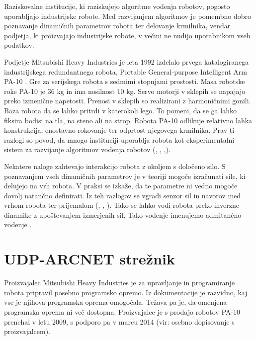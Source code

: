\documentclass[a4paper]{article}
\begin{document}
Raziskovalne institucije, ki raziskujejo algoritme vodenja robotov, pogosto uporabljajo industrijske robote. Med razvijanjem algoritmov je pomembno dobro poznavanje dinamičnih parametrov robota ter delovanje krmilnika, vendar podjetja, ki proizvajajo industrijske robote, v večini ne nudijo uporabnikom vseh podatkov.

Podjetje Mitsubishi Heavy Industries je leta 1992 izdelalo prvega katalogiranega industrijskega redundantnega robota, Portable General-purpose Intelligent Arm PA-10 \cite{mhi_pa10}. Gre za serijskega robota s sedmimi stopnjami prostosti. Masa robotske roke PA-10 je 36 kg in ima nosilnost 10 kg. Servo motorji v sklepih se napajajo preko izmenične napetosti. Prenosi v sklepih so realizirani z harmoničnimi gonili. Baza robota da se lahko pritrdi v katerokoli lego. To pomeni, da se ga lahko fiksira bodisi na tla, na steno ali na strop. Robota PA-10 odlikuje relativno lahka konstrukcija, enostavno rokovanje ter odprtost njegovega krmilnika. Prav ti razlogi so povod, da mnogo instituciji uporablja robota kot eksperimentalni sistem za razvijanje algoritmov vodenja robotov (\cite{voung_pa10}, \cite{aalst_pa10}, \cite{rodrigo_pa10},\cite{petric_nevronska}).

Nekatere naloge zahtevajo interakcijo robota z okoljem s določeno silo. S poznavanjem vseh dinamičnih parametrov je v teoriji mogoče izračunati sile, ki delujejo na vrh robota. V praksi se izkaže, da te parametre ni vedno mogoče dovolj natančno definirati. Iz teh razlogov se vgradi senzor sil in navorov med vrhom robota ter prijemalom (\cite{almassri_pressure_sensor}, \cite{mihelj_vodenje}, \cite{eppinger_force_dynamics}). Tako se lahko vodi robota preko inverzne dinamike z upoštevanjem izmerjenih sil. Tako vodenje imenujemo admitančno vodenje \cite{mihelj_hapt}.

	
\section{UDP-ARCNET strežnik}

Proizvajalec Mitsubishi Heavy Industries je za upravljanje in programiranje robota pripravil posebno programsko opremo. Iz dokumentacije je razvidno, kaj vse je njihova programska oprema omogočala. Težava pa je, da omenjena programska oprema ni več dostopna. Proizvajalec je s prodajo robotov PA-10 prenehal v letu 2009, s podporo pa v marcu 2014 (vir: osebno dopisovanje s proizvajalcem). 
\end{document}
